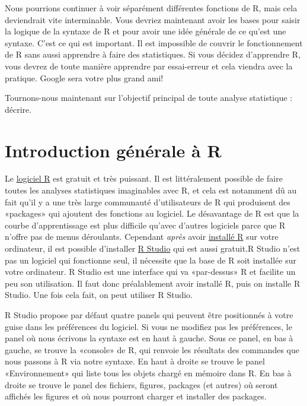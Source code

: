 \documentclass[
]{book}
\begin{document}
Nous pourrions continuer à voir séparément différentes fonctions de R, mais cela deviendrait vite interminable. Vous devriez maintenant avoir les bases pour saisir la logique de la syntaxe de R et pour avoir une idée générale de ce qu'est une syntaxe. C'est ce qui est important. Il est impossible de couvrir le fonctionnement de R sans aussi apprendre à faire des statistiques. Si vous décidez d'apprendre R, vous devrez de toute manière apprendre par essai-erreur et cela viendra avec la pratique. Google sera votre plus grand ami!

Tournons-nous maintenant sur l'objectif principal de toute analyse statistique : décrire.

\hypertarget{introduction-guxe9nuxe9rale-uxe0-r}{%
\chapter{Introduction générale à R}\label{introduction-guxe9nuxe9rale-uxe0-r}}

Le \href{https://www.r-project.org}{logiciel R} est gratuit et très puissant. Il est littéralement possible de faire toutes les analyses statistiques imaginables avec R, et cela est notamment dû au fait qu'il y a une très large communauté d'utilisateurs de R qui produisent des «packages» qui ajoutent des fonctions au logiciel. Le désavantage de R est que la courbe d'apprentissage est plus difficile qu'avec d'autres logiciels parce que R n'offre pas de menus déroulants. Cependant \emph{après} avoir \href{https://www.r-project.org}{installé R} sur votre ordinateur, il est possible d'installer \href{https://www.rstudio.com}{R Studio} qui est aussi gratuit.R Studio n'est pas un logiciel qui fonctionne seul, il nécessite que la base de R soit installée sur votre ordinateur. R Studio est une interface qui va «par-dessus» R et facilite un peu son utilisation. Il faut donc préalablement avoir installé R, puis on installe R Studio. Une fois cela fait, on peut utiliser R Studio.

R Studio propose par défaut quatre panels qui peuvent être positionnés à votre guise dans les préférences du logiciel. Si vous ne modifiez pas les préférences, le panel où nous écrivons la syntaxe est en haut à gauche. Sous ce panel, en bas à gauche, se trouve la «console» de R, qui renvoie les résultats des commandes que nous passons à R via notre syntaxe. En haut à droite se trouve le panel «Environnement» qui liste tous les objets chargé en mémoire dans R. En bas à droite se trouve le panel des fichiers, figures, packages (et autres) où seront affichés les figures et où nous pourront charger et installer des packages.
\end{document}
